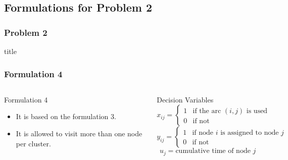 \documentclass[aspectratio=169]{beamer}
\begin{document}
\subsection{Formulations for Problem 2}
\begin{frame}
\frametitle{Problem 2}
  \begin{beamercolorbox}[sep=8pt,center,shadow=true,rounded=true]{title}
  \end{beamercolorbox}
  \vspace{\baselineskip}
\end{frame}


\begin{frame}
\frametitle{Formulation 4}
\begin{columns}
\begin{block}{Formulation 4}
\begin{itemize}
\item It is based on the formulation 3.
\item It is allowed to visit more than one node per cluster.
\
\end{itemize}
\end{block}
\begin{block}{Decision Variables}
\[x_{ij}={\begin{cases}1&{\mbox{if the arc $(i,j)$ is used }}\\0&{\mbox{if not}}\end{cases}}
\]
\[y_{ij}={\begin{cases}1&{\mbox{if node $i$ is assigned to node $j$}}\\0&{\mbox{if not}}\end{cases}}
\]
\[u_{j} = \mbox{cumulative time of node $j$}
\]
\end{block}
\end{columns}
\end{frame}

\end{document}
